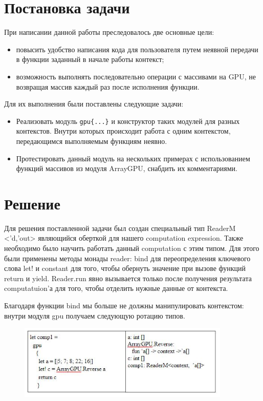 \documentclass[14pt]{matmex-diploma-custom}
\begin{document}
\section{Постановка задачи}
При написании данной работы преследовалось две основные цели:
\begin{itemize}
    \item повысить удобство написания кода для пользователя путем   неявной передачи в функции заданный в начале работы контекст;
\item возможность выполнять последовательно операции с  массивами на GPU, не    возвращая массив каждый раз после исполнения функции.   
\end{itemize}
Для их выполнения были поставлены следующие задачи:
\begin{itemize}
    \item Реализовать модуль \verb|gpu{...}| и конструктор таких модулей для разных контекстов. Внутри которых происходит работа с одним контекстом, передающимся выполняемым функциям неявно.
    \item Протестировать данный модуль на нескольких примерах с использованием функций массивов из модуля ArrayGPU, снабдить их комментариями.
\end{itemize}

\section{Решение}
Для решения поставленной задачи был создан специальный тип  
ReaderM <’d,’out> являющийся оберткой для нашего computation expression. Также необходимо было научить работать данный computation с этим типом. Для этого были применены методы монады reader: bind для переопределения ключевого слова let! и constant для того, чтобы обернуть значение при вызове функций return и yield. Reader.run явно вызывается только после получения результата computatuion’а для того, чтобы отделить нужные данные от контекста.

Благодаря функции bind мы больше не должны манипулировать контекстом: внутри модуля gpu получаем следующую ротацию типов.
\begin{figure}[h] 
\label{table}
\centering 
\includegraphics[width=0.9\textwidth]{images/types} 
\end{figure}
\end{document}
